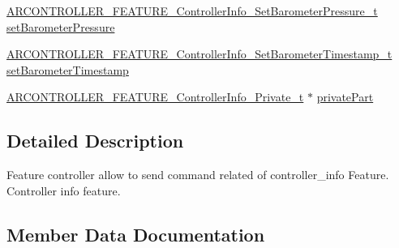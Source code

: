 \begin{DoxyCompactItemize}
\item 
\hyperlink{_a_r_c_o_n_t_r_o_l_l_e_r___feature_8h_ac3f35dfb8f8542e7e724ff15b02b007f}{A\+R\+C\+O\+N\+T\+R\+O\+L\+L\+E\+R\+\_\+\+F\+E\+A\+T\+U\+R\+E\+\_\+\+Controller\+Info\+\_\+\+Set\+Barometer\+Pressure\+\_\+t} \hyperlink{struct_a_r_c_o_n_t_r_o_l_l_e_r___f_e_a_t_u_r_e___controller_info__t_a2e25143d4f98ea3a7ccc85623d754886}{set\+Barometer\+Pressure}
\item 
\hyperlink{_a_r_c_o_n_t_r_o_l_l_e_r___feature_8h_a775bde657222bb07cd1806adede49f6a}{A\+R\+C\+O\+N\+T\+R\+O\+L\+L\+E\+R\+\_\+\+F\+E\+A\+T\+U\+R\+E\+\_\+\+Controller\+Info\+\_\+\+Set\+Barometer\+Timestamp\+\_\+t} \hyperlink{struct_a_r_c_o_n_t_r_o_l_l_e_r___f_e_a_t_u_r_e___controller_info__t_ab3e0afbf25b4f17f05ec286fe56f4f0e}{set\+Barometer\+Timestamp}
\item 
\hyperlink{_a_r_c_o_n_t_r_o_l_l_e_r___feature_8h_a529d4d59013fba5365e357fcc82c0a9f}{A\+R\+C\+O\+N\+T\+R\+O\+L\+L\+E\+R\+\_\+\+F\+E\+A\+T\+U\+R\+E\+\_\+\+Controller\+Info\+\_\+\+Private\+\_\+t} $\ast$ \hyperlink{struct_a_r_c_o_n_t_r_o_l_l_e_r___f_e_a_t_u_r_e___controller_info__t_a939e914565109c80ed2ebc7a091d95ba}{private\+Part}
\end{DoxyCompactItemize}


\subsection{Detailed Description}
Feature controller allow to send command related of controller\+\_\+info Feature. Controller info feature. 

\subsection{Member Data Documentation}

